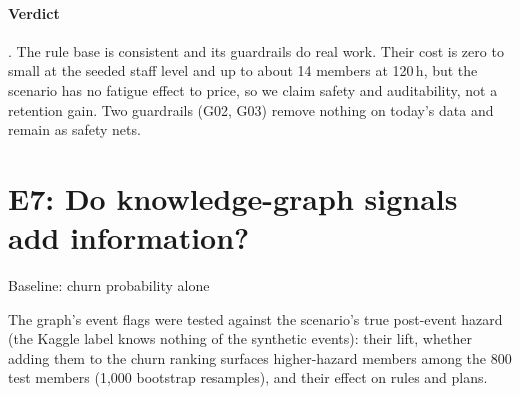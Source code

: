 \paragraph{Verdict} . The rule base is consistent and its guardrails do real work. Their cost is zero to small at the seeded staff level and up to about 14 members at 120\,h, but the scenario has no fatigue effect to price, so we claim safety and auditability, not a retention gain. Two guardrails (G02, G03) remove nothing on today's data and remain as safety nets.

\section{E7: Do knowledge-graph signals add information?}
\label{sec:e7}
\quad\textsf{\small Baseline: churn probability alone}

The graph's event flags were tested against the scenario's true post-event hazard (the Kaggle label knows nothing of the synthetic events): their lift, whether adding them to the churn ranking surfaces higher-hazard members among the 800 test members (1,000 bootstrap resamples), and their effect on rules and plans.

